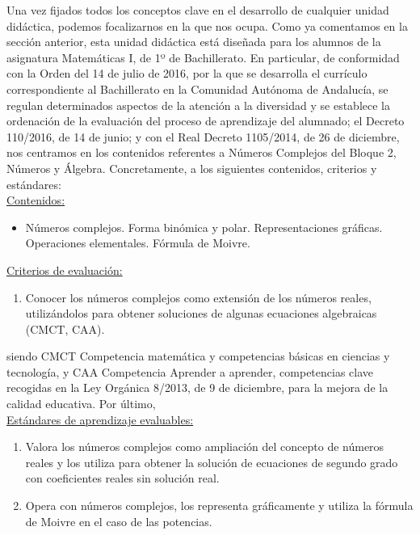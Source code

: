 \documentclass[../main.tex]{book}
\begin{document}
Una vez fijados todos los conceptos clave en el desarrollo de cualquier unidad didáctica, podemos focalizarnos en la que nos ocupa. Como ya comentamos en la sección anterior, esta unidad didáctica está diseñada para los alumnos de la asignatura Matemáticas I, de 1º de Bachillerato. En particular, de conformidad con la Orden del 14 de julio de 2016, por la que se desarrolla el currículo correspondiente al Bachillerato en  la  Comunidad  Autónoma  de  Andalucía,  se  regulan  determinados  aspectos  de  la  atención  a  la diversidad y se establece la ordenación de la evaluación del proceso de aprendizaje del alumnado; el Decreto 110/2016, de 14 de junio; y con el Real Decreto 1105/2014, de 26 de diciembre, nos centramos en los contenidos referentes a Números Complejos del Bloque 2, Números y Álgebra. Concretamente, a los siguientes contenidos, criterios y estándares: \\


\underline{Contenidos:}

\begin{itemize}
	\item Números complejos. Forma binómica y polar. Representaciones gráficas. Operaciones elementales. Fórmula de Moivre.
\end{itemize}

\underline{Criterios de evaluación:}

\begin{enumerate}
	\item Conocer los números complejos como extensión de los números reales, utilizándolos para obtener soluciones de algunas ecuaciones algebraicas (CMCT, CAA).
\end{enumerate}

siendo CMCT Competencia matemática y competencias básicas en ciencias y tecnología, y CAA Competencia Aprender a aprender, competencias clave recogidas en la Ley Orgánica 8/2013, de 9 de diciembre, para la mejora de la calidad educativa. Por último, \\

\underline{Estándares de aprendizaje evaluables:}

\begin{enumerate}
	\item Valora los números complejos como ampliación del concepto de números reales y los utiliza para obtener la solución de ecuaciones de segundo grado con coeficientes reales sin solución real.
	\item Opera con números complejos, los representa gráficamente y utiliza la fórmula de Moivre en el caso de las potencias.
\end{enumerate}
\end{document}
